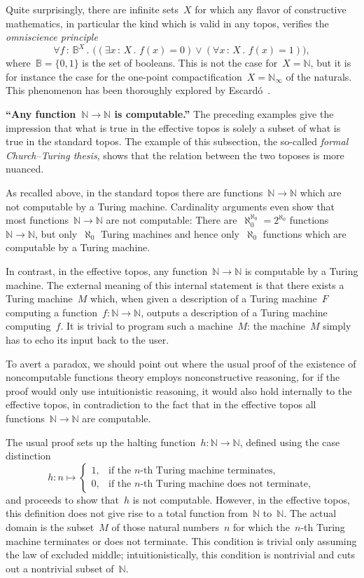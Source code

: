 \documentclass[graybox]{svmult}
\newcommand{\BB}{\mathbb{B}}
\newcommand{\NN}{\mathbb{N}}
\renewcommand{\_}{\mathpunct{.}\,}
\newcommand{\effective}{ef{}fective\xspace}
\newcommand{\?}{\,{:}\,}
\begin{document}
\begin{remark}Quite surprisingly, there are infinite sets~$X$ for which any flavor of constructive
mathematics, in particular the kind which is valid in any topos, verifies the
\emph{omniscience principle}
\[ \forall f\?\BB^X\_ \bigl((\exists x\?X\_ f(x) = 0) \vee (\forall x\?X\_ f(x)
= 1)\bigr), \]
where~$\BB = \{ 0, 1 \}$ is the set of booleans. This is not the case for~$X =
\NN$, but it is for instance the case for the one-point compactification~$X =
\NN_\infty$ of the naturals. This phenomenon has been thoroughly explored by
Escardó~\cite{escardo:omniscience}.\end{remark}

\begin{example}\textbf{``Any function~$\NN \to \NN$ is computable.''}
The preceding examples give the impression that what is true in the
\effective topos is solely a subset of what is true in the standard topos. The
example of this subsection, the so-called \emph{formal Church--Turing thesis},
shows that the relation between the two toposes is more nuanced.

As recalled above, in the standard topos there are functions~$\NN \to \NN$ which are not computable by a Turing
machine. Cardinality arguments
even show that most functions~$\NN \to \NN$ are not computable: There
are~$\aleph_0^{\aleph_0} = 2^{\aleph_0}$ functions~$\NN \to \NN$, but
only~$\aleph_0$ Turing machines and hence only~$\aleph_0$ functions which are
computable by a Turing machine.

In contrast, in the \effective topos, any function~$\NN \to \NN$ is computable
by a Turing machine. The external meaning of this internal statement is that
there exists a Turing machine~$M$ which, when given a description of a Turing
machine~$F$ computing a function~$f : \NN \to \NN$, outputs a description of a
Turing machine computing~$f$. It is trivial to program such a machine~$M$: the
machine~$M$ simply has to echo its input back to the user.

To avert a paradox, we should point out where the usual proof of the
existence of noncomputable functions theory employs nonconstructive reasoning, for if
the proof would only use intuitionistic reasoning, it would also hold internally to the
\effective topos, in contradiction to the fact that in the \effective topos
all functions~$\NN \to \NN$ are computable.

The usual proof sets up the halting function~$h : \NN \to \NN$, defined using
the case distinction
\[ h : n \mapsto \begin{cases}
  1, & \text{if the $n$-th Turing machine terminates}, \\
  0, & \text{if the $n$-th Turing machine does not terminate},
\end{cases} \]
and proceeds to show that~$h$ is not computable. However, in the \effective
topos, this definition does not give rise to a total function from~$\NN$
to~$\NN$. The actual domain is the subset~$M$ of those natural numbers~$n$
for which the~$n$-th Turing machine
terminates or does not terminate. This condition is trivial only assuming the
law of excluded middle; intuitionistically, this condition is nontrivial and
cuts out a nontrivial subset of~$\NN$.


\end{example}
\end{document}
